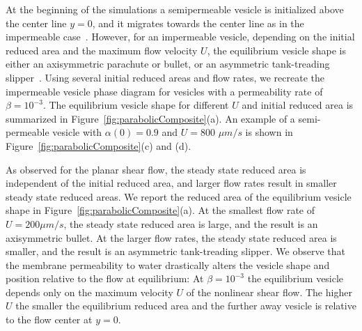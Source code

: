\documentclass[9pt,twocolumn,twoside,lineno]{pnas-new}
\begin{document}
At the beginning of the simulations a semipermeable vesicle is initialized
above the center line $y=0$, and it migrates towards the center
line as in the impermeable case~\cite{dan-vla-mis2009}. However, for an impermeable vesicle, depending on
the initial reduced area and the maximum flow velocity $U$, the equilibrium vesicle shape
is either an axisymmetric parachute or bullet, or an asymmetric
tank-treading slipper~\cite{kao-bir-mis2009}. 
%
%
Using several initial reduced areas and flow rates, we recreate the impermeable vesicle phase
diagram for vesicles with a permeability rate of $\beta = 10^{-3}$. The equilibrium vesicle shape for different $U$ and initial reduced area is summarized in
Figure~\ref{fig:parabolicComposite}(a). An example of a semi-permeable vesicle with $\alpha(0) = 0.9$ and $U=800$ $\mu m/s$ is
shown in Figure~\ref{fig:parabolicComposite}(c) and (d). 
%

As observed for the planar shear flow,
the steady state reduced area is independent of the initial reduced
area, and larger flow rates result in smaller steady state reduced
areas. We report the reduced area of the equilibrium vesicle shape in
Figure~\ref{fig:parabolicComposite}(a). At the smallest flow rate of $U= 200 \mu m/s$, the steady state reduced area is large, and the result
is an axisymmetric bullet. At the larger flow rates, the steady state
reduced area is smaller, and the result is an asymmetric tank-treading
slipper. We observe that the membrane permeability to water drastically alters the vesicle shape and position relative to the flow at equilibrium: At $\beta=10^{-3}$ the equilibrium vesicle depends only on the maximum velocity $U$ of the nonlinear shear flow. The higher $U$ the smaller the equilibrium reduced area and the further away vesicle is relative to the flow center at $y=0$. 
 
\end{document}
